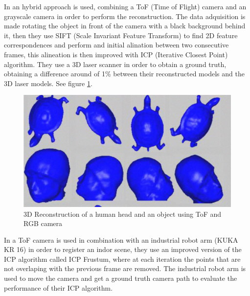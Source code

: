 In \cite{guangyu} an hybrid approach is used, combining a ToF (Time of Flight) camera and an grayscale camera in order to perform the reconstruction. 
The data adquisition is made rotating the object in front of the camera with a black background behind it, then they use 
SIFT (Scale Invariant Feature Transform) to find 2D feature correspondences and perform and initial alination between two consecutive frames, this alineation is 
then improved with ICP (Iterative Closest Point) algorithm. They use a 3D laser scanner in order to obtain a ground truth, obtaining a difference around of 1\% 
between their reconstructed
 models and the 3D laser models. See figure \ref{fig:guangyu}.




\begin{figure}[h!]
\begin{center}
\includegraphics[scale=0.38]{images/guangyu}
\caption{3D Reconstruction of a human head and an object using ToF and RGB camera}
\label{fig:guangyu}
\end{center}
\end{figure}

In \cite{may2009} a ToF camera is used in combination with an industrial robot arm (KUKA KR 16) in order to register an indor scene,
they use an improved version of the ICP algorithm called ICP Frustum, where at each iteration the points that are not overlaping with the previous frame are removed. The industrial robot arm is used to move the camera and get a ground truth camera path to evaluate the performance of their ICP algorithm. 




